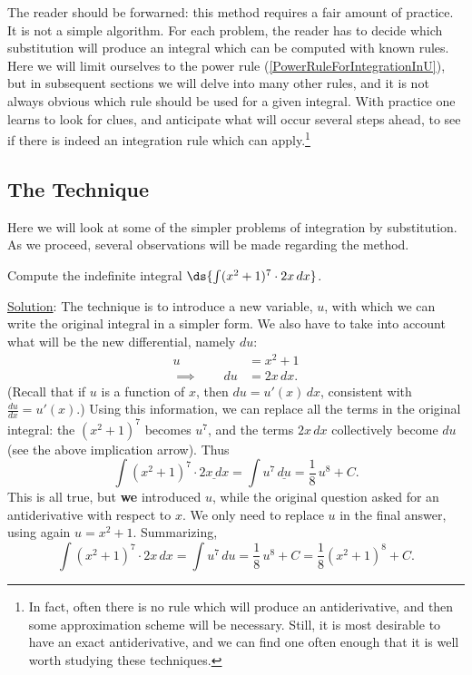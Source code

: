 The reader should be forwarned:  this method requires a fair amount 
of practice.  It is not a simple algorithm. For each problem, the
reader has to decide which substitution will produce an integral
which can be computed with known rules.  Here we will limit ourselves
to the power rule (\ref{PowerRuleForIntegrationInU}), but
in subsequent sections we will delve into many other rules, and
it is not always obvious which rule should be used for a given integral.
With practice one learns to look for clues, and anticipate what
will occur several steps ahead, to see if there is indeed an
integration rule which can apply.\footnote{%
In fact, often there is no rule which will produce an antiderivative,
and then some approximation scheme will be necessary.  Still, it is most
desirable to have an exact antiderivative, and we can find one
often enough that it is well worth studying these techniques.}

\subsection{The Technique}
Here we will look at some of the simpler problems of integration by
substitution.  As we proceed, several observations will be made
regarding the method.

\bex Compute the indefinite integral $\ds{\int (x^2+1)^7\cdot2x\,dx}$.

\underline{Solution}: The technique is to introduce a new variable,
$u$, with which we can write the original integral in a simpler form.
We also have to take into account what will be the new differential,
namely $du$:
\begin{align*}
u&=x^2+1\\
\implies\qquad du&=2x\,dx.
\end{align*}
(Recall that if $u$ is a function of $x$, then $du=u'(x)\,dx$,
consistent with $\frac{du}{dx}=u'(x)$.)  Using this information, we can
replace all the terms in the original integral: the $(x^2+1)^7$
becomes $u^7$, and the terms $2x\,dx$ collectively become $du$
(see the above implication arrow).  Thus
$$\int(x^2+1)^7\cdot\underline{2x\,dx}=\int u^7\,\underline{du}
=\frac18\,u^8+C.$$
This is all true, but {\bf we} introduced $u$, while the
original question asked for an antiderivative with respect to $x$.
We only need to replace $u$ in the final answer, using again
$u=x^2+1$.  Summarizing,
$$\int(x^2+1)^7\cdot{2x\,dx}
=\int u^7\,{du}=\frac18\,u^8+C=\frac18(x^2+1)^8+C.$$
\label{FirstUSubExample}\eex

